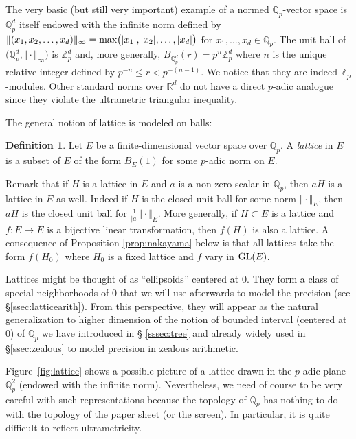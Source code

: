 \documentclass[11pt]{article}
\numberwithin{equation}{section}
\numberwithin{figure}{section}
\renewcommand{\leq}{\leqslant}
\theoremstyle{definition}
\newtheorem{deftn}[theo]{Definition}
\newcommand{\Z}{\mathbb Z}
\newcommand{\Zp}{\Z_p}
\newcommand{\Q}{\mathbb Q}
\newcommand{\Qp}{\Q_p}
\newcommand{\R}{\mathbb R}
\newcommand{\GL}{\text{\rm GL}}
\renewcommand{\max}{\text{\rm max}}
\begin{document}
The very basic (but still very important) example of a normed 
$\Qp$-vector space is $\Qp^d$ itself endowed with the infinite norm
defined by
$\Vert (x_1, x_2, \ldots, x_d) \Vert_\infty 
= \max \big(|x_1|, |x_2|, \ldots, |x_d|\big)$ for $x_1, \ldots, x_d
\in \Qp$.
The unit ball of $\big(\Qp^d, \Vert \cdot \Vert_\infty\big)$ is $\Zp^d$
and, more generally, $B_{\Qp^d}(r) = p^n \Zp^d$ where $n$ is the unique
relative integer defined by $p^{-n} \leq r < p^{-(n{-}1)}$. We notice
that they are indeed $\Zp$-modules.
Other standard norms over $\R^d$ do not have a direct $p$-adic analogue
since they violate the ultrametric triangular inequality.

\medskip

The general notion of lattice is modeled on balls:

\begin{deftn}
\label{def:latticeana}
Let $E$ be a finite-dimensional vector space over $\Qp$.
A \emph{lattice} in $E$ is a subset of $E$ of the form $B_E(1)$ 
for some $p$-adic norm on $E$.
\end{deftn}

\noindent
Remark that if $H$ is a lattice in $E$ and $a$ is a non zero scalar
in $\Qp$, then $aH$ is a lattice in $E$ as well. Indeed if $H$ is
the closed unit ball for some norm $\Vert \cdot \Vert_E$, then $aH$ 
is the closed unit ball for $\frac 1{|a|} \Vert \cdot \Vert_E$.
More generally, if $H \subset E$ is a lattice and $f : E \to E$ is
a bijective linear transformation, then $f(H)$ is also a lattice.
A consequence of Proposition \ref{prop:nakayama} below is that all
lattices take the form $f(H_0)$ where $H_0$ is a fixed lattice and
$f$ vary in $\GL(E)$.

Lattices might be thought of as ``ellipsoids'' centered at $0$. 
They form a class of special neighborhoods of $0$ that we will use 
afterwards to model the precision (see \S \ref{ssec:latticearith}).
From this perspective, they will 
appear as the natural generalization to higher dimension of the notion 
of bounded interval (centered at $0$) of $\Qp$ we have introduced in \S 
\ref{sssec:tree} and already widely used in \S \ref{ssec:zealous} to 
model precision in zealous arithmetic.

Figure~\ref{fig:lattice} shows a possible picture of a lattice drawn in 
the $p$-adic plane $\Qp^2$ (endowed with the infinite norm). 
Nevertheless, we need of course to be very careful with such 
representations because the topology of $\Qp$ has nothing to do with the 
topology of the paper sheet (or the screen). In particular, it is quite 
difficult to reflect ultrametricity.
\end{document}
